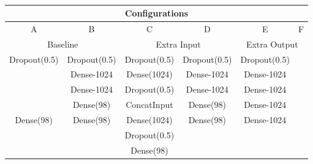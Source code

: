 \begin{table}[!h]
\begin{center}
\begin{tabular}{|c|c|c|c|c|c|}
\hline
\multicolumn{6}{|c|}{Configurations} \\ \hline
A & B & C & D & E & F \\ \hline
\multicolumn{2}{|c|}{Baseline} & \multicolumn{2}{|c|}{Extra Input} & \multicolumn{2}{|c|}{Extra Output} \\ \hline
Dropout(0.5)& Dropout(0.5)  & Dropout(0.5)  & Dropout(0.5) & Dropout(0.5) & \\
            & Dense-1024    & Dense(1024)   & Dense-1024 & Dense-1024 & \\
            & Dense-1024    & Dropout(0.5)  & Dense-1024 & Dense-1024 & \\
            & Dense(98)     & ConcatInput   & Dense(98)   & Dense-1024 & \\
Dense(98)   & Dense(98)     & Dense(1024)   & Dense(98)   & Dense-1024 & \\
            &               & Dropout(0.5)  &            &             & \\
            &               & Dense(98)     &            &             & \\ \hline
\end{tabular}
\end{center}
\caption[Network architectures]{}
\label{tab:net-arch}
\end{table}



\cleardoublepage